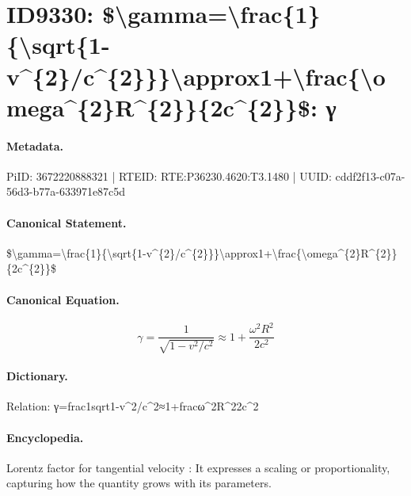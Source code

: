 \section*{ID9330: \$\textbackslash{}gamma=\textbackslash{}frac\{1\}\{\textbackslash{}sqrt\{1-v\textasciicircum{}\{2\}/c\textasciicircum{}\{2\}\}\}\textbackslash{}approx1+\textbackslash{}frac\{\textbackslash{}omega\textasciicircum{}\{2\}R\textasciicircum{}\{2\}\}\{2c\textasciicircum{}\{2\}\}\$: γ}
\paragraph{Metadata.}
PiID: 3672220888321 | RTEID: RTE:P36230.4620:T3.1480 | UUID: cddf2f13-c07a-56d3-b77a-633971e87c5d

\paragraph{Canonical Statement.}
\$\textbackslash{}gamma=\textbackslash{}frac\{1\}\{\textbackslash{}sqrt\{1-v\textasciicircum{}\{2\}/c\textasciicircum{}\{2\}\}\}\textbackslash{}approx1+\textbackslash{}frac\{\textbackslash{}omega\textasciicircum{}\{2\}R\textasciicircum{}\{2\}\}\{2c\textasciicircum{}\{2\}\}\$

\paragraph{Canonical Equation.}
\[
\gamma=\frac{1}{\sqrt{1-v^{2}/c^{2}}}\approx1+\frac{\omega^{2}R^{2}}{2c^{2}}
\]

\paragraph{Dictionary.}
Relation: γ=frac1sqrt1-v\textasciicircum{}2/c\textasciicircum{}2≈1+fracω\textasciicircum{}2R\textasciicircum{}22c\textasciicircum{}2

\paragraph{Encyclopedia.}
Lorentz factor for tangential velocity : It expresses a scaling or proportionality, capturing how the quantity grows with its parameters.
